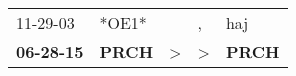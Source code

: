 \begin{supertabular}{p{0.07\textwidth}p{0.06\textwidth}p{0.02\textwidth}p{0.02\textwidth}p{0.06\textwidth}}
          11-29-03\textsuperscript{} &                            *OE1* &               &             , &            haj\textsuperscript{} \\
 \textbf{06-28-15\textsuperscript{}} &  \textbf{PRCH\textsuperscript{}} &  \textgreater &  \textgreater &  \textbf{PRCH\textsuperscript{}} \\
\end{supertabular}
